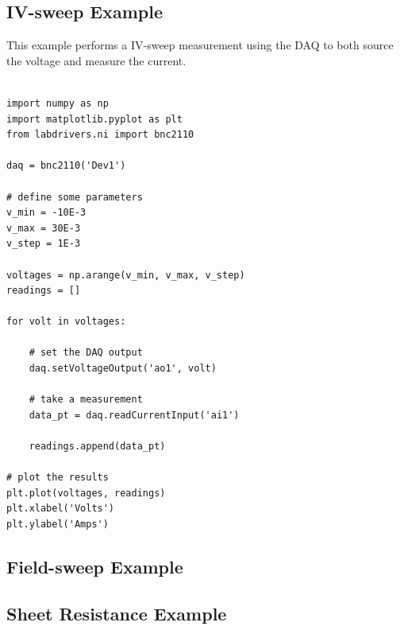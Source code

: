 \documentclass[edeposit,fullpage,draftthesis]{uiucthesis2009}
\begin{document}
\begin{appendices}
\newpage
\subsection{IV-sweep Example}

This example performs a IV-sweep measurement using the DAQ to both source the voltage and measure the current.
\begin{verbatim}
    
import numpy as np
import matplotlib.pyplot as plt
from labdrivers.ni import bnc2110

daq = bnc2110('Dev1')

# define some parameters
v_min = -10E-3
v_max = 30E-3
v_step = 1E-3

voltages = np.arange(v_min, v_max, v_step)
readings = []

for volt in voltages:

    # set the DAQ output
    daq.setVoltageOutput('ao1', volt)
    
    # take a measurement
    data_pt = daq.readCurrentInput('ai1')
    
    readings.append(data_pt)
    
# plot the results
plt.plot(voltages, readings)
plt.xlabel('Volts')
plt.ylabel('Amps')

\end{verbatim}

\subsection{Field-sweep Example}
\subsection{Sheet Resistance Example}

\end{appendices}

\backmatter


%
%
%
%
%

\end{document}
